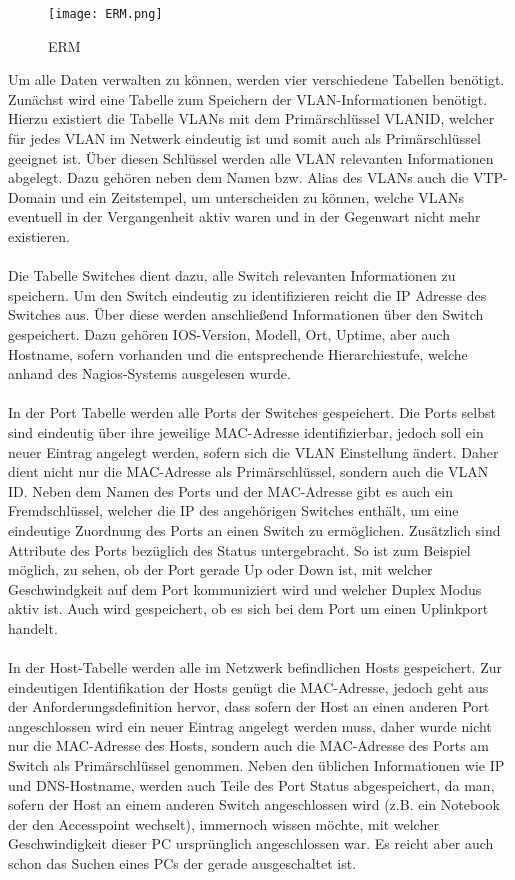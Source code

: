 \begin{figure}[H]
\centering
\texttt{[image: ERM.png]}
\caption{ERM}
\label{fig:erm}
\end{figure}

Um alle Daten verwalten zu können, werden vier verschiedene Tabellen benötigt.
Zunächst wird eine Tabelle zum Speichern der VLAN-Informationen benötigt.
Hierzu existiert die Tabelle VLANs mit dem Primärschlüssel VLANID, welcher für jedes VLAN im Netwerk eindeutig ist und somit auch als Primärschlüssel geeignet ist. Über diesen Schlüssel werden alle VLAN relevanten Informationen abgelegt. Dazu gehören neben dem Namen bzw. Alias des VLANs auch die VTP-Domain und ein Zeitstempel, um unterscheiden zu können, welche VLANs eventuell in der Vergangenheit aktiv waren und in der Gegenwart nicht mehr existieren.\\\\
Die Tabelle Switches dient dazu, alle Switch relevanten Informationen zu speichern. 
Um den Switch eindeutig zu identifizieren reicht die IP Adresse des Switches aus. Über diese werden anschließend Informationen über den Switch gespeichert. Dazu gehören IOS-Version, Modell, Ort, Uptime, aber auch Hostname, sofern vorhanden und die entsprechende Hierarchiestufe, welche anhand des Nagios-Systems ausgelesen wurde.\\\\
In der Port Tabelle werden alle Ports der Switches gespeichert. Die Ports selbst sind eindeutig über ihre jeweilige MAC-Adresse identifizierbar, jedoch soll ein neuer Eintrag angelegt werden, sofern sich die VLAN Einstellung ändert.
Daher dient nicht nur die MAC-Adresse als Primärschlüssel, sondern auch die VLAN ID.
Neben dem Namen des Ports und der MAC-Adresse gibt es auch ein Fremdschlüssel, welcher die IP des angehörigen Switches enthält, um eine eindeutige Zuordnung des Ports an einen Switch zu ermöglichen.
Zusätzlich sind Attribute des Ports bezüglich des Status untergebracht.
So ist zum Beispiel möglich, zu sehen, ob der Port gerade Up oder Down ist, mit welcher Geschwindgkeit auf dem Port kommuniziert wird und welcher Duplex Modus aktiv ist. Auch wird gespeichert, ob es sich bei dem Port um einen Uplinkport handelt.\\\\
In der Host-Tabelle werden alle im Netzwerk befindlichen Hosts gespeichert.
Zur eindeutigen Identifikation der Hosts genügt die MAC-Adresse, jedoch geht aus der Anforderungsdefinition hervor, dass sofern der Host an einen anderen Port angeschlossen wird ein neuer Eintrag angelegt werden muss, daher wurde nicht nur die MAC-Adresse des Hosts, sondern auch die MAC-Adresse des Ports am Switch als Primärschlüssel genommen. Neben den üblichen Informationen wie IP und DNS-Hostname, werden auch Teile des Port Status abgespeichert, da man, sofern der Host an einem anderen Switch angeschlossen wird (z.B. ein Notebook der den Accesspoint wechselt), immernoch wissen möchte, mit welcher Geschwindigkeit dieser PC ursprünglich angeschlossen war. Es reicht aber auch schon das Suchen eines PCs der gerade ausgeschaltet ist.
